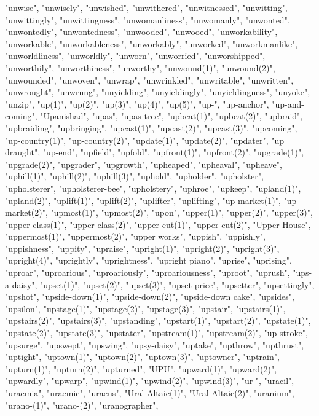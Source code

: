 "unwise",
"unwisely",
"unwished",
"unwithered",
"unwitnessed",
"unwitting",
"unwittingly",
"unwittingness",
"unwomanliness",
"unwomanly",
"unwonted",
"unwontedly",
"unwontedness",
"unwooded",
"unwooed",
"unworkability",
"unworkable",
"unworkableness",
"unworkably",
"unworked",
"unworkmanlike",
"unworldliness",
"unworldly",
"unworn",
"unworried",
"unworshipped",
"unworthily",
"unworthiness",
"unworthy",
"unwound(1)",
"unwound(2)",
"unwounded",
"unwoven",
"unwrap",
"unwrinkled",
"unwritable",
"unwritten",
"unwrought",
"unwrung",
"unyielding",
"unyieldingly",
"unyieldingness",
"unyoke",
"unzip",
"up(1)",
"up(2)",
"up(3)",
"up(4)",
"up(5)",
"up-",
"up-anchor",
"up-and-coming",
"Upanishad",
"upas",
"upas-tree",
"upbeat(1)",
"upbeat(2)",
"upbraid",
"upbraiding",
"upbringing",
"upcast(1)",
"upcast(2)",
"upcast(3)",
"upcoming",
"up-country(1)",
"up-country(2)",
"update(1)",
"update(2)",
"updater",
"up draught",
"up-end",
"upfield",
"upfold",
"upfront(1)",
"upfront(2)",
"upgrade(1)",
"upgrade(2)",
"upgrader",
"upgrowth",
"upheaped",
"upheaval",
"upheave",
"uphill(1)",
"uphill(2)",
"uphill(3)",
"uphold",
"upholder",
"upholster",
"upholsterer",
"upholsterer-bee",
"upholstery",
"uphroe",
"upkeep",
"upland(1)",
"upland(2)",
"uplift(1)",
"uplift(2)",
"uplifter",
"uplifting",
"up-market(1)",
"up-market(2)",
"upmost(1)",
"upmost(2)",
"upon",
"upper(1)",
"upper(2)",
"upper(3)",
"upper class(1)",
"upper class(2)",
"upper-cut(1)",
"upper-cut(2)",
"Upper House",
"uppermost(1)",
"uppermost(2)",
"upper works",
"uppish",
"uppishly",
"uppishness",
"uppity",
"upraise",
"upright(1)",
"upright(2)",
"upright(3)",
"upright(4)",
"uprightly",
"uprightness",
"upright piano",
"uprise",
"uprising",
"uproar",
"uproarious",
"uproariously",
"uproariousness",
"uproot",
"uprush",
"ups-a-daisy",
"upset(1)",
"upset(2)",
"upset(3)",
"upset price",
"upsetter",
"upsettingly",
"upshot",
"upside-down(1)",
"upside-down(2)",
"upside-down cake",
"upsides",
"upsilon",
"upstage(1)",
"upstage(2)",
"upstage(3)",
"upstair",
"upstairs(1)",
"upstairs(2)",
"upstairs(3)",
"upstanding",
"upstart(1)",
"upstart(2)",
"upstate(1)",
"upstate(2)",
"upstate(3)",
"upstater",
"upstream(1)",
"upstream(2)",
"up-stroke",
"upsurge",
"upswept",
"upswing",
"upsy-daisy",
"uptake",
"upthrow",
"upthrust",
"uptight",
"uptown(1)",
"uptown(2)",
"uptown(3)",
"uptowner",
"uptrain",
"upturn(1)",
"upturn(2)",
"upturned",
"UPU",
"upward(1)",
"upward(2)",
"upwardly",
"upwarp",
"upwind(1)",
"upwind(2)",
"upwind(3)",
"ur-",
"uracil",
"uraemia",
"uraemic",
"uraeus",
"Ural-Altaic(1)",
"Ural-Altaic(2)",
"uranium",
"urano-(1)",
"urano-(2)",
"uranographer",
